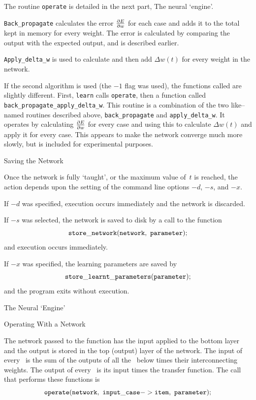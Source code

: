 The routine {\tt operate} is detailed in the next part, The neural
`engine'.

{\tt Back\_propagate} calculates the error $\partial E \over
\partial w$ for each case and adds it to the total kept in memory
for every weight.
The error is calculated by comparing the output with the expected
output, and is described earlier.

{\tt Apply\_delta\_w} is used to calculate and then add $\Delta
w(t)$ for every weight in the network.

If the second algorithm is used (the $-1$ flag was used), the functions 
called are slightly different.
First, {\tt learn} calls {\tt operate}, then a function called
{\tt back\-\_propagate\-\_apply\-\_delta\-\_w}.
This routine is a combination of the two like--named routines
described above, {\tt back\-\_propagate} and {\tt apply\-\_delta\-\_w}.
It operates by calculating $\partial E \over \partial w$ for every
case and using this to calculate $\Delta w(t)$ and apply it for
every case.
This appears to make the network converge much more slowly, but is
included for experimental purposes.

\sssec Saving the Network

Once the network is fully `taught', or the maximum value of~$t$ is
reached, the action depends upon the setting of the command line
options $-d$, $-s$, and $-x$.

If $-d$ was specified, execution occurs immediately and the network
is discarded.

If $-s$ was selected, the network is saved to disk by a call to the
function
$$
	{\tt store\_network(network,\ parameter);}
$$
and execution occurs immediately.

If $-x$ was specified, the learning parameters are saved by
$$
	{\tt store\_learnt\_parameters(parameter);}
$$
and the program exits without execution.

\ssec The Neural `Engine'

\sssec Operating With a Network

The network passed to the function has the input applied to the
bottom layer and the output is stored in the top (output) layer of
the network.
The input of every \neu\ is the sum of the outputs of all the
\neus\ below times their interconnecting weights.
The output of every \neu\ is its input times the transfer function.
The call that performs these functions is
$$
	{\tt operate(network,\ input\_case->item,\ parameter);}
$$

